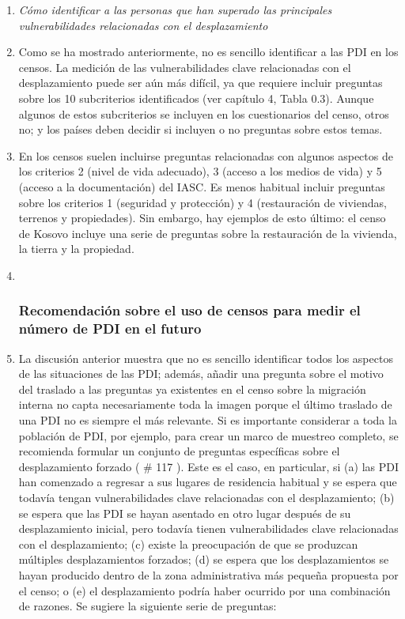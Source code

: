 \documentclass[
]{book}
\begin{document}
\begin{enumerate}
\item
  \emph{Cómo identificar a las personas que han superado las principales vulnerabilidades relacionadas con el desplazamiento}
\item
  Como se ha mostrado anteriormente, no es sencillo identificar a las PDI en los censos. La medición de las vulnerabilidades clave relacionadas con el desplazamiento puede ser aún más difícil, ya que requiere incluir preguntas sobre los 10 subcriterios identificados (ver capítulo 4, Tabla 0.3). Aunque algunos de estos subcriterios se incluyen en los cuestionarios del censo, otros no; y los países deben decidir si incluyen o no preguntas sobre estos temas.
\item
  En los censos suelen incluirse preguntas relacionadas con algunos aspectos de los criterios 2 (nivel de vida adecuado), 3 (acceso a los medios de vida) y 5 (acceso a la documentación) del IASC. Es menos habitual incluir preguntas sobre los criterios 1 (seguridad y protección) y 4 (restauración de viviendas, terrenos y propiedades). Sin embargo, hay ejemplos de esto último: el censo de Kosovo incluye una serie de preguntas sobre la restauración de la vivienda, la tierra y la propiedad.
\item ~
  \hypertarget{recomendaciuxf3n-sobre-el-uso-de-censos-para-medir-el-nuxfamero-de-pdi-en-el-futuro}{%
  \subsubsection{Recomendación sobre el uso de censos para medir el número de PDI en el futuro}\label{recomendaciuxf3n-sobre-el-uso-de-censos-para-medir-el-nuxfamero-de-pdi-en-el-futuro}}
\item
  La discusión anterior muestra que no es sencillo identificar todos los aspectos de las situaciones de las PDI; además, añadir una pregunta sobre el motivo del traslado a las preguntas ya existentes en el censo sobre la migración interna no capta necesariamente toda la imagen porque el último traslado de una PDI no es siempre el más relevante. Si es importante considerar a toda la población de PDI, por ejemplo, para crear un marco de muestreo completo, se recomienda formular un conjunto de preguntas específicas sobre el desplazamiento forzado (
  \# 117
  ). Este es el caso, en particular, si (a) las PDI han comenzado a regresar a sus lugares de residencia habitual y se espera que todavía tengan vulnerabilidades clave relacionadas con el desplazamiento; (b) se espera que las PDI se hayan asentado en otro lugar después de su desplazamiento inicial, pero todavía tienen vulnerabilidades clave relacionadas con el desplazamiento; (c) existe la preocupación de que se produzcan múltiples desplazamientos forzados; (d) se espera que los desplazamientos se hayan producido dentro de la zona administrativa más pequeña propuesta por el censo; o (e) el desplazamiento podría haber ocurrido por una combinación de razones. Se sugiere la siguiente serie de preguntas:
\end{enumerate}
\end{document}
